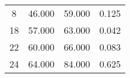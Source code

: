 % 
\begin{tabular}{cccc}
  \hline
  \hline
8 & 46.000 & 59.000 & 0.125 \\ 
  18 & 57.000 & 63.000 & 0.042 \\ 
  22 & 60.000 & 66.000 & 0.083 \\ 
  24 & 64.000 & 84.000 & 0.625 \\ 
   \hline
\end{tabular}
